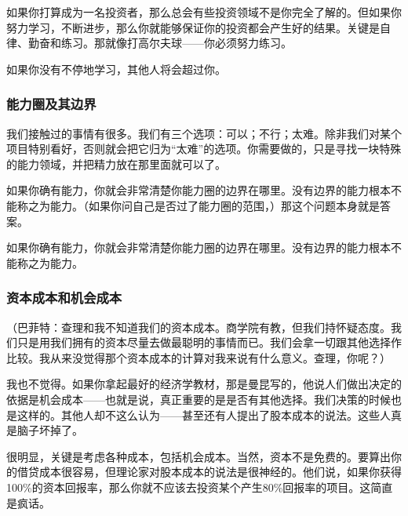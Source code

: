 如果你打算成为一名投资者，那么总会有些投资领域不是你完全了解的。但如果你努力学习，不断进步，那么你就能够保证你的投资都会产生好的结果。关键是自律、勤奋和练习。那就像打高尔夫球——你必须努力练习。
\par

如果你没有不停地学习，其他人将会超过你。
\par

\subsubsection*{能力圈及其边界}

我们接触过的事情有很多。我们有三个选项：可以；不行；太难。除非我们对某个项目特别看好，否则就会把它归为“太难”的选项。你需要做的，只是寻找一块特殊的能力领域，并把精力放在那里面就可以了。
\par

如果你确有能力，你就会非常清楚你能力圈的边界在哪里。没有边界的能力根本不能称之为能力。（如果你问自己是否过了能力圈的范围，）那这个问题本身就是答案。
\par

\begin{WisdomBox}
\par

如果你确有能力，你就会非常清楚你能力圈的边界在哪里。没有边界的能力根本不能称之为能力。
\par
\end{WisdomBox}

\subsubsection*{资本成本和机会成本}

（巴菲特：查理和我不知道我们的资本成本。商学院有教，但我们持怀疑态度。我们只是用我们拥有的资本尽量去做最聪明的事情而已。我们会拿一切跟其他选择作比较。我从来没觉得那个资本成本的计算对我来说有什么意义。查理，你呢？）
\par

我也不觉得。如果你拿起最好的经济学教材，那是曼昆写的，他说人们做出决定的依据是机会成本——也就是说，真正重要的是是否有其他选择。我们决策的时候也是这样的。其他人却不这么认为——甚至还有人提出了股本成本的说法。这些人真是脑子坏掉了。
\par

很明显，关键是考虑各种成本，包括机会成本。当然，资本不是免费的。要算出你的借贷成本很容易，但理论家对股本成本的说法是很神经的。他们说，如果你获得100\%的资本回报率，那么你就不应该去投资某个产生80\%回报率的项目。这简直是疯话。
\par

